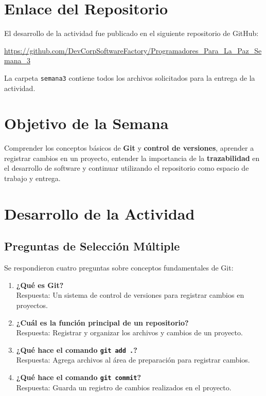 \documentclass[12pt,a4paper]{article}
\begin{document}
\section{Enlace del Repositorio}

El desarrollo de la actividad fue publicado en el siguiente repositorio de GitHub:

\vspace{0.5cm}

\begin{center}
\large
\url{https://github.com/DevCorpSoftwareFactory/Programadores_Para_La_Paz_Semana_3}
\end{center}

\vspace{0.5cm}

\noindent La carpeta \texttt{semana3} contiene todos los archivos solicitados para la entrega de la actividad.

\section{Objetivo de la Semana}

Comprender los conceptos básicos de \textbf{Git} y \textbf{control de versiones}, aprender a registrar cambios en un proyecto, entender la importancia de la \textbf{trazabilidad} en el desarrollo de software y continuar utilizando el repositorio como espacio de trabajo y entrega.

\section{Desarrollo de la Actividad}

\subsection{Preguntas de Selección Múltiple}

Se respondieron cuatro preguntas sobre conceptos fundamentales de Git:

\begin{enumerate}[label=\textbf{\arabic*.}]
    \item \textbf{¿Qué es Git?} \\
    Respuesta: Un sistema de control de versiones para registrar cambios en proyectos.
    
    \item \textbf{¿Cuál es la función principal de un repositorio?} \\
    Respuesta: Registrar y organizar los archivos y cambios de un proyecto.
    
    \item \textbf{¿Qué hace el comando \texttt{git add .}?} \\
    Respuesta: Agrega archivos al área de preparación para registrar cambios.
    
    \item \textbf{¿Qué hace el comando \texttt{git commit}?} \\
    Respuesta: Guarda un registro de cambios realizados en el proyecto.
\end{enumerate}
\end{document}
